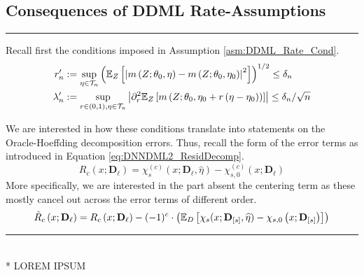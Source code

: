 \subsection{Consequences of DDML Rate-Assumptions}
\hrule

Recall first the conditions imposed in Assumption \ref{asm:DDML_Rate_Cond}.
\begin{align}
    r_{n}^{\prime}
    & :=\sup_{\eta \in \mathcal{T}_{n}}\left(\mathbb{E}_{Z}\left[\left|m\left(Z; \theta_0, \eta\right)-m\left(Z; \theta_0, \eta_0\right)\right|^2\right]\right)^{1 / 2} 
    \leq \delta_{n}\\
    \lambda_{n}^{\prime}
    & :=\sup_{r \in(0,1), \eta \in \mathcal{T}_{n}}\left|\partial_r^2 \mathbb{E}_{Z}\left[m\left(Z; \theta_0, \eta_0+r\left(\eta-\eta_0\right)\right)\right]\right| 
    \leq \delta_{n} / \sqrt{n}
\end{align}

We are interested in how these conditions translate into statements on the Oracle-Hoeffding decomposition errors.
Thus, recall the form of the error terms as introduced in Equation \ref{eq:DNNDML2_ResidDecomp}.
\begin{equation}
    R_{c}\left(x; \mathbf{D}_{\ell}\right) 
    = \chi_{s}^{(c)}\left(x; \mathbf{D}_{\ell}, \hat{\eta}\right) - \chi_{s,0}^{(c)}\left(x; \mathbf{D}_{\ell}\right)
\end{equation}
More specifically, we are interested in the part absent the centering term as these mostly cancel out across the error terms of different order.
\begin{equation}
    \tilde{R}_{c}\left(x; \mathbf{D}_{\ell}\right)
    = R_{c}\left(x; \mathbf{D}_{\ell}\right) - (-1)^{c} \cdot \left(\mathbb{E}_{D}\left[\chi_{s}(x; \mathbf{D}_{[s]}, \widehat{\eta}) - \chi_{s,0}\left(x; \mathbf{D}_{[s]}\right)\right]\right)
\end{equation}

\hrule

\begin{boxD}
    \begin{lem}[]\label{lem:rate_cond_errors1}\mbox{}\\*
    {\color{red} LOREM IPSUM}
\end{lem}    
\end{boxD}

